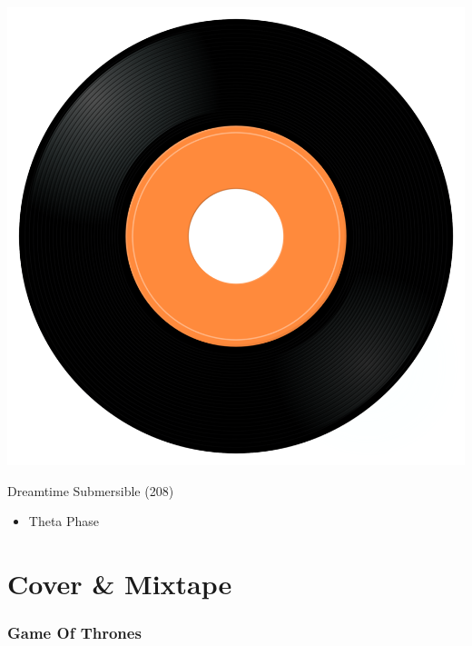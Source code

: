 \begin{minipage}[t]{0.25\textwidth}\vspace{0pt}
\captionsetup{type=figure}
\includegraphics[width=\textwidth]{Images/cover.png}
\caption*{Dreamtime Submersible (208)}
\end{minipage}
\begin{minipage}[t]{0.25\textwidth}\vspace{0pt}
\begin{itemize}[nosep,leftmargin=1em,labelwidth=*,align=left]
	\setlength{\itemsep}{0pt}
	\item Theta Phase
\end{itemize}
\end{minipage}


\section{Cover \& Mixtape}

\subsubsection{Game Of Thrones}

